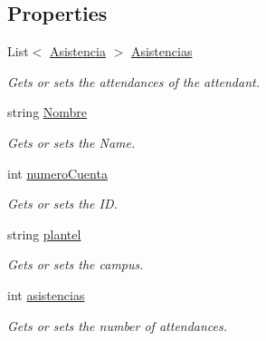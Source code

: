 \subsection*{Properties}
\begin{DoxyCompactItemize}
\item 
List$<$ \hyperlink{class_asistencias__wpf_1_1_asistencia}{Asistencia} $>$ \hyperlink{class_asistencias__wpf_1_1_asistente_a7f5283d025ade6827ef7504f111bc1c7}{Asistencias}
\begin{DoxyCompactList}\small\item\em Gets or sets the attendances of the attendant. \end{DoxyCompactList}\item 
string \hyperlink{class_asistencias__wpf_1_1_asistente_a321714ee92e497c61236fedca32912cb}{Nombre}
\begin{DoxyCompactList}\small\item\em Gets or sets the Name. \end{DoxyCompactList}\item 
int \hyperlink{class_asistencias__wpf_1_1_asistente_a6d2aa009497445d62699e3c9d402ca78}{numero\-Cuenta}
\begin{DoxyCompactList}\small\item\em Gets or sets the I\-D. \end{DoxyCompactList}\item 
string \hyperlink{class_asistencias__wpf_1_1_asistente_a4346dd7e16f0e8ef5de301d5e2b0439b}{plantel}
\begin{DoxyCompactList}\small\item\em Gets or sets the campus. \end{DoxyCompactList}\item 
int \hyperlink{class_asistencias__wpf_1_1_asistente_a3457b6737f1c9a57b1e19d27c10405c9}{asistencias}
\begin{DoxyCompactList}\small\item\em Gets or sets the number of attendances. \end{DoxyCompactList}\end{DoxyCompactItemize}
